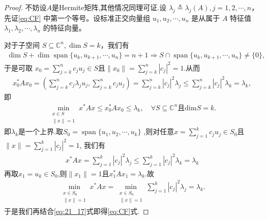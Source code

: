 \documentclass[../../main.tex]{subfiles}%
\begin{document}
\begin{proof}

不妨设$A$是Hermite矩阵,其他情况同理可证.设 $\lambda_j \triangleq \lambda_j(A), j=1,2,\cdots,n$，先证\eqref{eq:CF} 中第一个等号。设标准正交向量组 $u_1,u_2,\cdots,u_n$ 是从属于 $A$ 特征值 $\lambda_1,\lambda_2,\cdots,\lambda_n$ 的特征向量。

对于子空间 $S\subseteq \mathbb{C}^n, \dim S=k$，我们有
\begin{align*}
\dim S + \dim \operatorname{span}\{u_k,u_{k+1},\cdots,u_n\} = n+1 \Longrightarrow S\cap \operatorname{span}\{u_k,u_{k+1},\cdots,u_n\} \neq \{0\},
\end{align*}
于是可取 $x_0=\sum_{j=k}^n c_j u_j \in S$且$\|x_0\|=\sum_{j=k}^n |c_j|^2 = 1.$从而
\begin{align*}
x_0^*Ax_0 = \left(\sum_{j=k}^n c_j \lambda_j u_j, \sum_{j=k}^n c_j u_j\right) = \sum_{j=k}^n |c_j|^2 \lambda_j \leqslant \sum_{j=k}^n |c_j|^2 \lambda_k = \lambda_k,
\end{align*}
即
\begin{align}
\min_{\substack{x\in S\\
\|x\|=1}} x^*Ax\leqslant x_{0}^{*}Ax_0\leqslant \lambda _k,\quad \forall S\subseteq \mathbb{C} ^n\text{且dim}S=k.
\label{eq:21_17}
\end{align}
即$\lambda_k$是一个上界.取$S_0=\operatorname{span}\{u_1,u_2,\cdots,u_k\}$ ,则对任意$x=\sum_{j=1}^k c_j u_j \in S_0$且$\|x\|=\sum_{j=1}^{k}|c_j|^2=1$,
我们有
\begin{align*}
x^*Ax=\sum_{j=1}^k{|c_j|^2\lambda _j}\leqslant \sum_{j=1}^k{|c_j|^2\lambda _k}=\lambda _k
\end{align*}
再取$x_1=u_k\in S_0$,则$\|x_1\|=1$且$x_1^*Ax_1=\lambda_k$.故
\begin{align*}
\min_{\substack{x\in S_0\\
\|x\|=1}} x^*Ax =\min_{\substack{x\in S_0\\
\|x\|=1}} \sum_{j=1}^k |c_j|^2 \lambda_j = \lambda_k.
\end{align*}
于是我们再结合\eqref{eq:21_17}式即得\eqref{eq:CF}式.


\end{proof}
\end{document}
